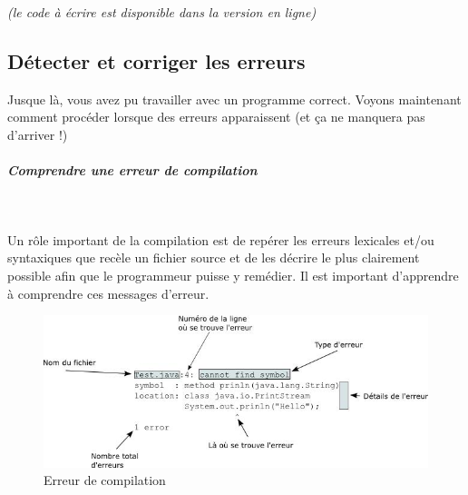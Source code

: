 \documentclass[a4paper,11pt]{article}
\begin{document}
            \par
         {\footnotesize\emph{(le code \`a \'ecrire est disponible dans la version en ligne)}\par} 
			
%		
%				
%        
%				

	\subsection{D\'etecter et corriger les erreurs}  
          	Jusque l\`a, vous avez pu travailler avec un programme correct. Voyons maintenant comment proc\'eder lorsque des erreurs apparaissent 
		(et \c ca ne manquera pas d'arriver !)   
        
            	\par
        
			
		\subparagraph{Comprendre une erreur de compilation} 
		
			\textcolor{white}{.} \par
          		Un r\^ole important de la compilation est de rep\'erer les erreurs lexicales et/ou syntaxiques que rec\`ele un fichier source 
         		 et de les d\'ecrire le plus clairement possible afin que le programmeur puisse y rem\'edier. 
         		 Il est important d'apprendre \`a comprendre ces messages d'erreur.   
        
            		\par
		
        			\begin{figure}[hbt]
				\begin{center}
					\includegraphics[width=0.8\linewidth,height=0.8\textheight,keepaspectratio=true]{image/ErreurCompil.jpg}
				\end{center}
                
                   		 \caption[Erreur de compilation]{Erreur de compilation}
               		 \end{figure}
                    
\end{document}
